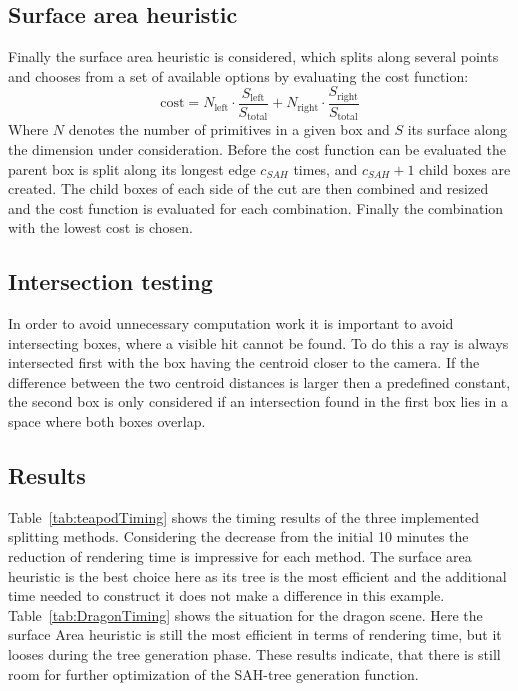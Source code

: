 \subsection{Surface area heuristic}
Finally the surface area heuristic is considered, which splits along several points and chooses from a set of available options by evaluating the cost function:
\begin{equation}
\text{cost} = N_{\text{left}} \cdot \frac{S_{\text{left}}}{S_{\text{total}}} +
              N_{\text{right}} \cdot \frac{S_{\text{right}}}{S_{\text{total}}}
\end{equation}
Where $N$ denotes the number of primitives in a given box and $S$ its surface along the dimension under consideration. Before the cost function can be evaluated the parent box is split along its longest edge $c_{SAH}$ times, and $c_{SAH} + 1$ child boxes are created. The child boxes of each side of the cut are then combined and resized and the cost function is evaluated for each combination. Finally the combination with the lowest cost is chosen. 

\subsection{Intersection testing}
In order to avoid unnecessary computation work it is important to avoid intersecting boxes, where a visible hit cannot be found. To do this a ray is always intersected first with the box having the centroid closer to the camera. If the difference between the two centroid distances is larger then a predefined constant, the second box is only considered if an intersection found in the first box lies in a space where both boxes overlap. 

\subsection{Results}
Table~\ref{tab:teapodTiming} shows the timing results of the three implemented splitting methods. Considering the decrease from the initial 10 minutes the reduction of rendering time is impressive for each method. The surface area heuristic is the best choice here as its tree is the most efficient and the additional time needed to construct it does not make a difference in this example. Table~\ref{tab:DragonTiming} shows the situation for the dragon scene. Here the surface Area heuristic is still the most efficient in terms of rendering time, but it looses during the tree generation phase. These results indicate, that there is still room for further optimization of the SAH-tree generation function.  

